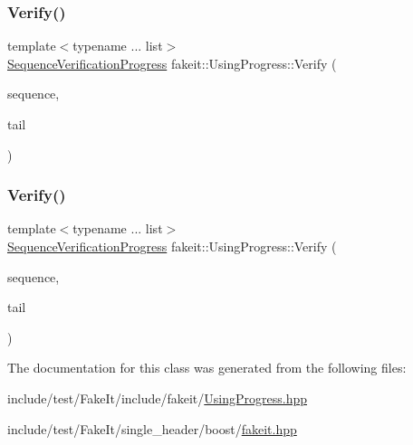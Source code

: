 \subsubsection{\texorpdfstring{Verify()}{Verify()}\hspace{0.1cm}{\footnotesize\ttfamily [8/9]}}
{\footnotesize\ttfamily template$<$typename ... list$>$ \\
\mbox{\hyperlink{classfakeit_1_1SequenceVerificationProgress}{Sequence\+Verification\+Progress}} fakeit\+::\+Using\+Progress\+::\+Verify (\begin{DoxyParamCaption}\item[{const \mbox{\hyperlink{classfakeit_1_1Sequence}{fakeit\+::\+Sequence}} \&}]{sequence,  }\item[{const list \&...}]{tail }\end{DoxyParamCaption})\hspace{0.3cm}{\ttfamily [inline]}}

\mbox{\label{classfakeit_1_1UsingProgress_a56c5d1ecdf4f405a4a85b348e1fad0f1}} 
\subsubsection{\texorpdfstring{Verify()}{Verify()}\hspace{0.1cm}{\footnotesize\ttfamily [9/9]}}
{\footnotesize\ttfamily template$<$typename ... list$>$ \\
\mbox{\hyperlink{classfakeit_1_1SequenceVerificationProgress}{Sequence\+Verification\+Progress}} fakeit\+::\+Using\+Progress\+::\+Verify (\begin{DoxyParamCaption}\item[{const \mbox{\hyperlink{classfakeit_1_1Sequence}{fakeit\+::\+Sequence}} \&}]{sequence,  }\item[{const list \&...}]{tail }\end{DoxyParamCaption})\hspace{0.3cm}{\ttfamily [inline]}}



The documentation for this class was generated from the following files\+:\begin{DoxyCompactItemize}
\item 
include/test/\+Fake\+It/include/fakeit/\mbox{\hyperlink{UsingProgress_8hpp}{Using\+Progress.\+hpp}}\item 
include/test/\+Fake\+It/single\+\_\+header/boost/\mbox{\hyperlink{single__header_2boost_2fakeit_8hpp}{fakeit.\+hpp}}\end{DoxyCompactItemize}
